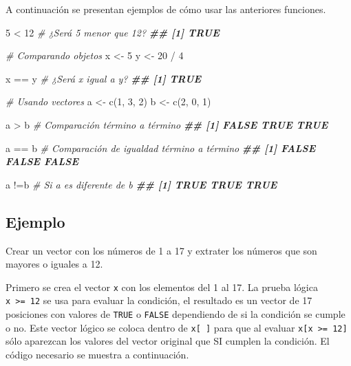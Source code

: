 \documentclass[
]{book}
\newenvironment{Shaded}{\begin{snugshade}}{\end{snugshade}}
\newcommand{\CommentTok}[1]{\textcolor[rgb]{0.56,0.35,0.01}{\textit{#1}}}
\newcommand{\DecValTok}[1]{\textcolor[rgb]{0.00,0.00,0.81}{#1}}
\newcommand{\DocumentationTok}[1]{\textcolor[rgb]{0.56,0.35,0.01}{\textbf{\textit{#1}}}}
\newcommand{\FunctionTok}[1]{\textcolor[rgb]{0.00,0.00,0.00}{#1}}
\newcommand{\NormalTok}[1]{#1}
\newcommand{\OtherTok}[1]{\textcolor[rgb]{0.56,0.35,0.01}{#1}}
\newcommand{\SpecialCharTok}[1]{\textcolor[rgb]{0.00,0.00,0.00}{#1}}
\begin{document}
A continuación se presentan ejemplos de cómo usar las anteriores funciones.

\begin{Shaded}
\begin{Highlighting}[]
\DecValTok{5} \SpecialCharTok{\textless{}} \DecValTok{12}  \CommentTok{\# ¿Será 5 menor que 12?}
\DocumentationTok{\#\# [1] TRUE}

\CommentTok{\# Comparando objetos}
\NormalTok{x }\OtherTok{\textless{}{-}} \DecValTok{5}
\NormalTok{y }\OtherTok{\textless{}{-}} \DecValTok{20} \SpecialCharTok{/} \DecValTok{4}

\NormalTok{x }\SpecialCharTok{==}\NormalTok{ y  }\CommentTok{\# ¿Será x igual a y?}
\DocumentationTok{\#\# [1] TRUE}

\CommentTok{\# Usando vectores}
\NormalTok{a }\OtherTok{\textless{}{-}} \FunctionTok{c}\NormalTok{(}\DecValTok{1}\NormalTok{, }\DecValTok{3}\NormalTok{, }\DecValTok{2}\NormalTok{)}
\NormalTok{b }\OtherTok{\textless{}{-}} \FunctionTok{c}\NormalTok{(}\DecValTok{2}\NormalTok{, }\DecValTok{0}\NormalTok{, }\DecValTok{1}\NormalTok{)}

\NormalTok{a }\SpecialCharTok{\textgreater{}}\NormalTok{ b  }\CommentTok{\# Comparación término a término}
\DocumentationTok{\#\# [1] FALSE  TRUE  TRUE}

\NormalTok{a }\SpecialCharTok{==}\NormalTok{ b  }\CommentTok{\# Comparación de igualdad término a término}
\DocumentationTok{\#\# [1] FALSE FALSE FALSE}

\NormalTok{a }\SpecialCharTok{!=}\NormalTok{b }\CommentTok{\# Si a es diferente de b}
\DocumentationTok{\#\# [1] TRUE TRUE TRUE}
\end{Highlighting}
\end{Shaded}

\hypertarget{ejemplo-6}{%
\subsection*{Ejemplo}\label{ejemplo-6}}

Crear un vector con los números de 1 a 17 y extrater los números que son mayores o iguales a 12.

Primero se crea el vector \texttt{x} con los elementos del 1 al 17. La prueba lógica \texttt{x\ \textgreater{}=\ 12} se usa para evaluar la condición, el resultado es un vector de 17 posiciones con valores de \texttt{TRUE} o \texttt{FALSE} dependiendo de si la condición se cumple o no. Este vector lógico se coloca dentro de \texttt{x{[}\ {]}} para que al evaluar \texttt{x{[}x\ \textgreater{}=\ 12{]}} sólo aparezcan los valores del vector original que SI cumplen la condición. El código necesario se muestra a continuación.
\end{document}
